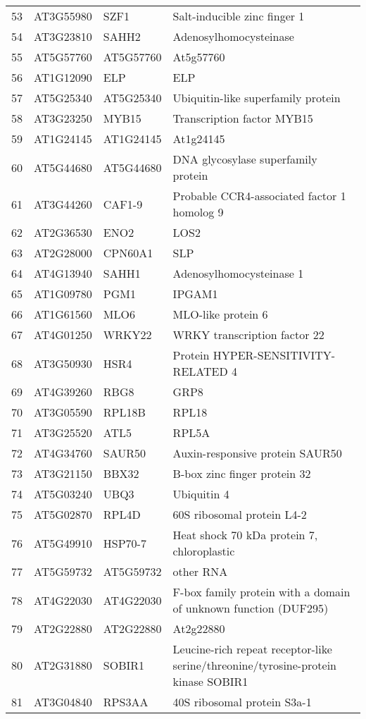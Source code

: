 \documentclass[a4paper]{article}
\begin{document}
\begin{center}
\begin{tabular}{rlll}
53 & AT3G55980 & SZF1 & Salt-inducible zinc finger 1\\
54 & AT3G23810 & SAHH2 & Adenosylhomocysteinase\\
55 & AT5G57760 & AT5G57760 & At5g57760\\
56 & AT1G12090 & ELP & ELP\\
57 & AT5G25340 & AT5G25340 & Ubiquitin-like superfamily protein\\
58 & AT3G23250 & MYB15 & Transcription factor MYB15\\
59 & AT1G24145 & AT1G24145 & At1g24145\\
60 & AT5G44680 & AT5G44680 & DNA glycosylase superfamily protein\\
61 & AT3G44260 & CAF1-9 & Probable CCR4-associated factor 1 homolog 9\\
62 & AT2G36530 & ENO2 & LOS2\\
63 & AT2G28000 & CPN60A1 & SLP\\
64 & AT4G13940 & SAHH1 & Adenosylhomocysteinase 1\\
65 & AT1G09780 & PGM1 & IPGAM1\\
66 & AT1G61560 & MLO6 & MLO-like protein 6\\
67 & AT4G01250 & WRKY22 & WRKY transcription factor 22\\
68 & AT3G50930 & HSR4 & Protein HYPER-SENSITIVITY-RELATED 4\\
69 & AT4G39260 & RBG8 & GRP8\\
70 & AT3G05590 & RPL18B & RPL18\\
71 & AT3G25520 & ATL5 & RPL5A\\
72 & AT4G34760 & SAUR50 & Auxin-responsive protein SAUR50\\
73 & AT3G21150 & BBX32 & B-box zinc finger protein 32\\
74 & AT5G03240 & UBQ3 & Ubiquitin 4\\
75 & AT5G02870 & RPL4D & 60S ribosomal protein L4-2\\
76 & AT5G49910 & HSP70-7 & Heat shock 70 kDa protein 7, chloroplastic\\
77 & AT5G59732 & AT5G59732 & other RNA\\
78 & AT4G22030 & AT4G22030 & F-box family protein with a domain of unknown function (DUF295)\\
79 & AT2G22880 & AT2G22880 & At2g22880\\
80 & AT2G31880 & SOBIR1 & Leucine-rich repeat receptor-like serine/threonine/tyrosine-protein kinase SOBIR1\\
81 & AT3G04840 & RPS3AA & 40S ribosomal protein S3a-1\\

\end{tabular}
\end{center}
\end{document}
